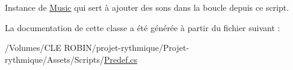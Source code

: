 Instance de \hyperlink{class_music}{Music} qui sert à ajouter des sons dans la boucle depuis ce script. 



La documentation de cette classe a été générée à partir du fichier suivant \+:\begin{DoxyCompactItemize}
\item 
/\+Volumes/\+C\+L\+E R\+O\+B\+I\+N/projet-\/rythmique/\+Projet-\/rythmique/\+Assets/\+Scripts/\hyperlink{_predef_8cs}{Predef.\+cs}\end{DoxyCompactItemize}
